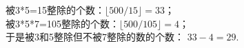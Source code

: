 \begin{solution}
    被3*5=15整除的个数：$\lfloor500/15\rfloor=33$；\\
    被3*5*7=105整除的个数：$\lfloor500/105\rfloor=4$；\\
    于是被3和5整除但不被7整除的数的个数：
    $33-4=29$.
\end{solution}